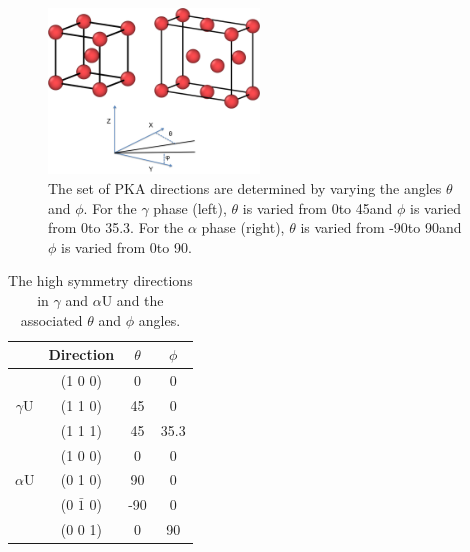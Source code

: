 \documentclass[review]{elsarticle}
\begin{document}
\begin{figure}[h]
 \centering
 \includegraphics[width=0.5\textwidth]{directionsA.png} 
 \caption{The set of PKA directions are determined by varying the angles $\theta$ and $\phi$. For the $\gamma$ phase (left), $\theta$ is varied from 0\degree to 45\degree and $\phi$ is varied from 0\degree to 35.3\degree. For the $\alpha$ phase (right), $\theta$ is varied from -90\degree to 90\degree and $\phi$ is varied from 0\degree to 90\degree.}
 \label{fig:directions}
\end{figure}

\begin{table}[h]
\caption{The high symmetry directions in $\gamma$ and $\alpha$U and the associated $\theta$ and $\phi$ angles.} \label{tab:dirs}
\begin{center}
\begin{tabular}{|c|c|c|c|}
	\hline
	& Direction & $\theta$ & $\phi$ \\
	 \hline
	 & (1 0 0) & 0 & 0 \\
	$\gamma$U & (1 1 0) & 45 & 0 \\
	& (1 1 1) & 45 & 35.3 \\
	 \hline
	 	 & (1 0 0) & 0 & 0 \\
	$\alpha$U & (0 1 0) & 90 & 0 \\
	& (0 $\bar{1}$ 0) & -90 & 0 \\
	& (0 0 1) & 0 & 90 \\
	 \hline
\end{tabular}
\end{center}
\label{default}
\end{table}


\FloatBarrier
\end{document}
